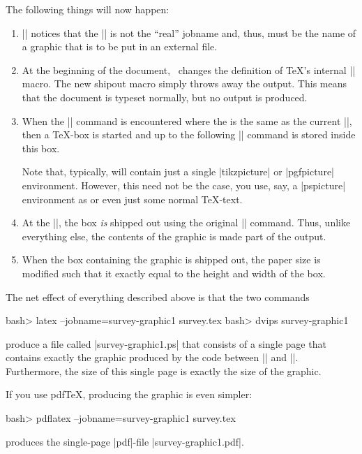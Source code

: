 The following things will now happen:
\begin{enumerate}
\item |\pgfrealjobname| notices that the |\jobname|
  is not the ``real'' jobname and, thus, must be the name of a graphic
  that is to be put in an external file.
\item At the beginning of the document, \pgfname\ changes the
  definition of \TeX's internal |\shipout| macro. The new shipout
  macro simply throws away the output. This means that the document is
  typeset normally, but no output is produced.
\item When the || command is
  encountered where the  is the same as the current
  |\jobname|, then a \TeX-box is started and  up to the
  following |\endpgfgraphicnamed| command is stored inside this box.

  Note that, typically,  will contain just a single
  |{tikzpicture}| or |{pgfpicture}| environment. However, this need
  not be the case, you use, say, a |{pspicture}| environment as
   or even just some normal \TeX-text.
\item At the |\endpgfgraphicnamed|, the box \emph{is} shipped out
  using the original |\shipout| command. Thus, unlike everything else,
  the contents of the graphic is made part of the output.
\item When the box containing the graphic is shipped out, the paper
  size is modified such that it exactly equal to the height and width
  of the box.
\end{enumerate}

The net effect of everything described above is that the two
commands
\begin{codeexample}
bash> latex --jobname=survey-graphic1 survey.tex
bash> dvips survey-graphic1
\end{codeexample}
\noindent produce a file called |survey-graphic1.ps| that consists of a single
page that contains exactly the graphic produced by the code between
|| and
|\endpgfgraphicnamed|. Furthermore, the size of this single page is
exactly the size of the graphic.

If you use pdf\TeX, producing the graphic is even simpler:
\begin{codeexample}
bash> pdflatex --jobname=survey-graphic1 survey.tex
\end{codeexample}
\noindent produces the single-page |pdf|-file |survey-graphic1.pdf|.

